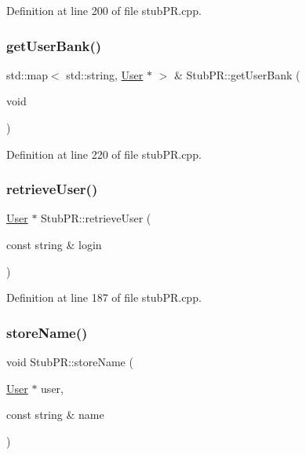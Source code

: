 Definition at line 200 of file stub\+P\+R.\+cpp.

\mbox{\label{class_stub_p_r_a207ac73b07ca1512135e9bcf8392930c}} 
\subsubsection{\texorpdfstring{get\+User\+Bank()}{getUserBank()}}
{\footnotesize\ttfamily std\+::map$<$ std\+::string, \hyperlink{class_user}{User} $\ast$ $>$ \& Stub\+P\+R\+::get\+User\+Bank (\begin{DoxyParamCaption}\item[{void}]{ }\end{DoxyParamCaption})}



Definition at line 220 of file stub\+P\+R.\+cpp.

\mbox{\label{class_stub_p_r_a9a422786005387ec3eebd751fba4d065}} 
\subsubsection{\texorpdfstring{retrieve\+User()}{retrieveUser()}}
{\footnotesize\ttfamily \hyperlink{class_user}{User} $\ast$ Stub\+P\+R\+::retrieve\+User (\begin{DoxyParamCaption}\item[{const string \&}]{login }\end{DoxyParamCaption})}



Definition at line 187 of file stub\+P\+R.\+cpp.

\mbox{\label{class_stub_p_r_a17e7dc40468374e5b7cc01de19dcd0ed}} 
\subsubsection{\texorpdfstring{store\+Name()}{storeName()}}
{\footnotesize\ttfamily void Stub\+P\+R\+::store\+Name (\begin{DoxyParamCaption}\item[{\hyperlink{class_user}{User} $\ast$}]{user,  }\item[{const string \&}]{name }\end{DoxyParamCaption})}



